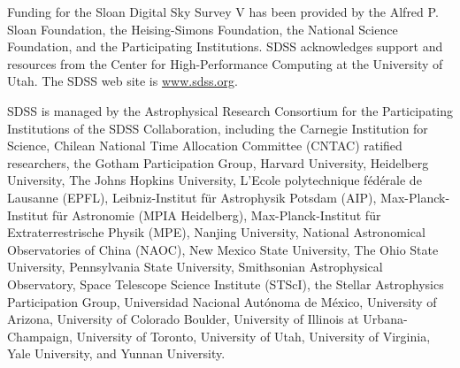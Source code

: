 \documentclass[modern]{aastex631}
\begin{document}
Funding for the Sloan Digital Sky Survey V has been provided by the Alfred P. Sloan Foundation, the Heising-Simons Foundation, the National Science Foundation, and the Participating Institutions. SDSS acknowledges support and resources from the Center for High-Performance Computing at the University of Utah. The SDSS web site is \url{www.sdss.org}.

SDSS is managed by the Astrophysical Research Consortium for the Participating Institutions of the SDSS Collaboration, including the Carnegie Institution for Science, Chilean National Time Allocation Committee (CNTAC) ratified researchers, the Gotham Participation Group, Harvard University, Heidelberg University, The Johns Hopkins University, L’Ecole polytechnique f\'{e}d\'{e}rale de Lausanne (EPFL), Leibniz-Institut f{\"u}r Astrophysik Potsdam (AIP), Max-Planck-Institut f{\"u}r Astronomie (MPIA Heidelberg), Max-Planck-Institut f{\"u}r Extraterrestrische Physik (MPE), Nanjing University, National Astronomical Observatories of China (NAOC), New Mexico State University, The Ohio State University, Pennsylvania State University, Smithsonian Astrophysical Observatory, Space Telescope Science Institute (STScI), the Stellar Astrophysics Participation Group, Universidad Nacional Aut\'{o}noma de M\'{e}xico, University of Arizona, University of Colorado Boulder, University of Illinois at Urbana-Champaign, University of Toronto, University of Utah, University of Virginia, Yale University, and Yunnan University.




{}

\end{document}
